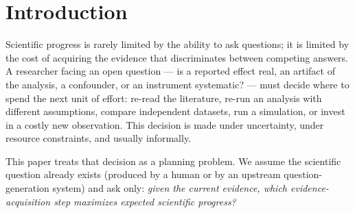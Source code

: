 \documentclass[11pt]{article}
\begin{document}
\begin{abstract}
historically resolving actions. Scaling the benchmark to all $374$ of
Paper 3's tension questions --- each evidence cluster batch-converted
to a graph by transparent rules and planned at its own historical
cutoff --- turns the metrics into distributions and surfaces a
structural result: planner utility runs opposite to measured community
attention (pooled permutation $p = 0.004$), because both are driven,
with opposite sign, by the breadth of the existing evidence base. We
then dismantle the appealing reading of that result. The effect does
not survive stratification by breadth, and its residual concentrates in
the high-specificity stratum where Paper 3's retrieval-bounded label is
documented to under-count engagement. Re-adjudicating all $62$
high-specificity questions blind, against citation-graph retrieval
rather than abstract keyword matching, recovers $94\%$ of the questions
the label calls unaddressed ($69\%$ under the strictest bar) and the
utility effect vanishes ($p = 0.70$ and $0.61$, against $0.004$). The
divergence between resolution-driven and attention-driven allocation is
therefore real as a mechanism but is not evidence of detected neglect;
the durable empirical result is a measured bound on the outcome label
itself. The framework is released as a reference implementation with
seven evaluation metrics, full configurability, and no domain
assumptions in code.
\end{abstract}

\section{Introduction}

Scientific progress is rarely limited by the ability to ask questions; it
is limited by the cost of acquiring the evidence that discriminates
between competing answers. A researcher facing an open question --- is a
reported effect real, an artifact of the analysis, a confounder, or an
instrument systematic? --- must decide where to spend the next unit of
effort: re-read the literature, re-run an analysis with different
assumptions, compare independent datasets, run a simulation, or invest in
a costly new observation. This decision is made under uncertainty, under
resource constraints, and usually informally.

This paper treats that decision as a planning problem. We assume the
scientific question already exists (produced by a human or by an upstream
question-generation system) and ask only: \emph{given the current
evidence, which evidence-acquisition step maximizes expected scientific
progress?}
\end{document}
